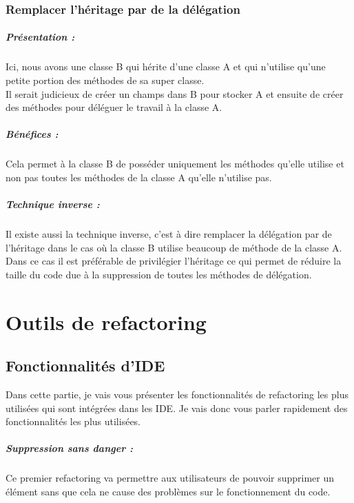 \documentclass[a4paper,twoside,12pt,openright]{report}
\begin{document}
\subsection{Remplacer l'héritage par de la délégation}
\paragraph{Présentation :}
Ici, nous avons une classe B qui hérite d'une classe A et qui n'utilise qu'une petite portion des méthodes de sa super classe.\\
Il serait judicieux de créer un champs dans B pour stocker A et ensuite de créer des méthodes pour déléguer le travail à la classe A.\\

\paragraph{Bénéfices :}
Cela permet à la classe B de posséder uniquement les méthodes qu'elle utilise et non pas toutes les méthodes de la classe A qu'elle n'utilise pas.\\

\paragraph{Technique inverse :}
Il existe aussi la technique inverse, c'est à dire remplacer la délégation par de l'héritage dans le cas où la classe B utilise beaucoup de méthode de la classe A.
Dans ce cas il est préférable de privilégier l'héritage ce qui permet de réduire la taille du code due à la suppression de toutes les méthodes de délégation.\\

\chapter{Outils de refactoring}
\section{Fonctionnalités d'IDE}
Dans cette partie, je vais vous présenter les fonctionnalités de refactoring les plus utilisées qui sont intégrées dans les IDE.
Je vais donc vous parler rapidement des fonctionnalités les plus utilisées.\\

\paragraph{Suppression sans danger :}
Ce premier refactoring va permettre aux utilisateurs de pouvoir supprimer un élément sans que cela ne cause des problèmes sur le fonctionnement du code.\\
\end{document}
